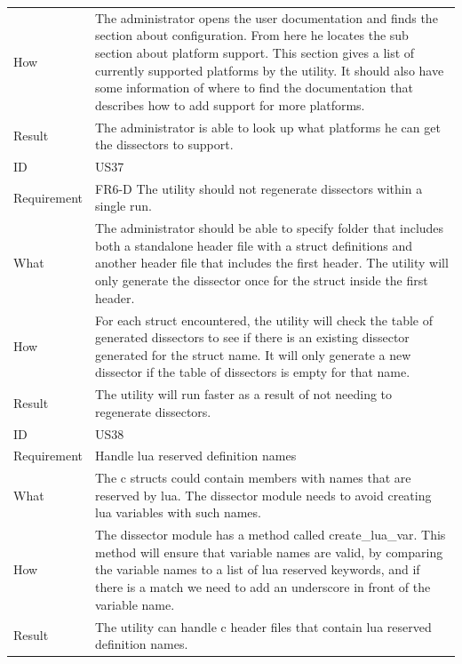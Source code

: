 \begin{table}[htbp]
{\begin{tabularx}{1.2\textwidth}{l X}
	How & The administrator opens the user documentation and finds the section about configuration. From here he locates the sub section about platform support.
	This section gives a list of currently supported platforms by the \gls{utility}. It should also have some information of where to	find the documentation that describes
	how to add support for more platforms. \\
	Result & The administrator is able to look up what platforms he can get the \glspl{dissector} to support. \\
	\midrule
	ID & US37 \\
	Requirement & FR6-D The \gls{utility} should not regenerate \glspl{dissector} within a single run. \\
	What & The administrator should be able to specify folder that includes both a standalone \gls{header} file with a \gls{struct} definitions and another \gls{header} file that includes
	the first \gls{header}. The \gls{utility} will only generate the \gls{dissector} once for the \gls{struct} inside the first \gls{header}. \\
	How & For each \gls{struct} encountered, the \gls{utility} will check the table of generated \glspl{dissector} to see if there is an existing \gls{dissector} generated for the \gls{struct} name.
	It will only generate a new \gls{dissector} if the table of \glspl{dissector} is empty for that name. \\
	Result & The \gls{utility} will run faster as a result of not needing to regenerate \glspl{dissector}. \\
	\midrule
	ID & US38 \\
	Requirement & Handle \Gls{lua} reserved definition names \\
	What & The \Gls{c} \glspl{struct} could contain \glspl{member} with names that are reserved by \Gls{lua}. The \gls{dissector} module needs to avoid creating \Gls{lua} variables with such names.  \\
	How &	 The \gls{dissector} module has a method called create\_lua\_var. This method will ensure that variable names are valid, by comparing the variable names to a list
	of \Gls{lua} reserved keywords, and if there is a match we need to add an underscore in front of the variable name. \\ 
	Result & The \gls{utility} can handle \Gls{c} \gls{header} files that contain \Gls{lua} reserved definition names. \\
	\bottomrule
\end{tabularx}}
\end{table}

